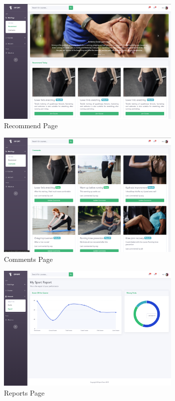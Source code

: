 \documentclass[16pt]{scrreprt}
\begin{document}
\begin{figure}[H]
	\centering
	\includegraphics[width=0.8\textwidth]{diagrams/recommend.png}
	\caption{Recommend Page}
\end{figure}

\begin{figure}[H]
	\centering
	\includegraphics[width=0.8\textwidth]{diagrams/comment.png}
	\caption{Comments Page}
\end{figure}

\begin{figure}[H]
	\centering
	\includegraphics[width=0.8\textwidth]{diagrams/report.png}
	\caption{Reports Page}
\end{figure}
\end{document}
